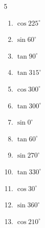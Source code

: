 \begin{multicols}{5}
\begin{enumerate}
  \item $\displaystyle \cos{225^\circ}$


  \item $\displaystyle \sin{60^\circ}$


  \item $\displaystyle \tan{90^\circ}$

        \phantom{$\displaystyle なし$}

  \item $\displaystyle \tan{315^\circ}$

        \phantom{$\displaystyle =-1$}

\columnbreak %

  \item $\displaystyle \cos{300^\circ}$


  \item $\displaystyle \tan{300^\circ}$


  \item $\displaystyle \sin{0^\circ}$

        \phantom{$\displaystyle =0$}

  \item $\displaystyle \tan{60^\circ}$


  \item $\displaystyle \sin{270^\circ}$

        \phantom{$\displaystyle =-1$}

  \item $\displaystyle \tan{330^\circ}$


  \item $\displaystyle \cos{30^\circ}$


  \item $\displaystyle \sin{360^\circ}$

        \phantom{$\displaystyle =0$}

  \item $\displaystyle \cos{210^\circ}$


\end{enumerate}
\end{multicols}
